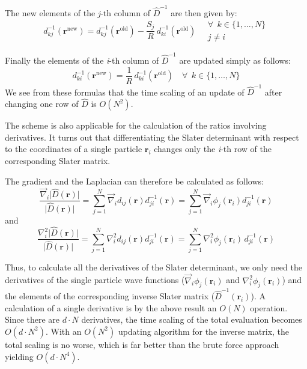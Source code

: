 \documentclass[graybox,sectrefs,envcountresetchap,open=right]{svmonodo}
\begin{document}
The new elements of the \emph{j}-th column of $\hat{D}^{-1}$ are then given
by:
\begin{equation}
d_{kj}^{-1}(\mathbf{r}^{\mathrm{new}}) =
d_{kj}^{-1}(\mathbf{r}^{\mathrm{old}}) -
\frac{S_j}{R}\,d_{ki}^{-1}(\mathbf{r}^{\mathrm{old}})\quad
\begin{array}{ll}
\forall\ \ k\in\{1,\dots,N\}\\j\neq i
\end{array}
\label{eq:inverse_update_2}
\end{equation}






Finally the elements of the \emph{i}-th column of $\hat{D}^{-1}$ are updated
simply as follows:
\begin{equation}
d_{ki}^{-1}(\mathbf{r}^{\mathrm{new}}) =
\frac{1}{R}\,d_{ki}^{-1}(\mathbf{r}^{\mathrm{old}})\quad
\forall\ \ k\in\{1,\dots,N\}
\label{eq:inverse_update_3}
\end{equation}
We see from these formulas that the time scaling of an update of
$\hat{D}^{-1}$ after changing one row of $\hat{D}$ is $O(N^2)$.


The scheme is also applicable for the calculation of the ratios
involving derivatives. It turns
out that differentiating the Slater determinant with respect
to the coordinates of a single particle  $\mathbf{r}_i$ changes only the
\emph{i}-th row of the corresponding Slater matrix. 



The gradient and the Laplacian can therefore be calculated as follows:
\[
\frac{\vec\nabla_i\vert\hat{D}(\mathbf{r})\vert}{\vert\hat{D}(\mathbf{r})\vert} =
\sum_{j=1}^N \vec\nabla_i d_{ij}(\mathbf{r})d_{ji}^{-1}(\mathbf{r}) =
\sum_{j=1}^N \vec\nabla_i \phi_j(\mathbf{r}_i)d_{ji}^{-1}(\mathbf{r})
\]
and
\[
\frac{\nabla^2_i\vert\hat{D}(\mathbf{r})\vert}{\vert\hat{D}(\mathbf{r})\vert} =
\sum_{j=1}^N \nabla^2_i d_{ij}(\mathbf{r})d_{ji}^{-1}(\mathbf{r}) =
\sum_{j=1}^N \nabla^2_i \phi_j(\mathbf{r}_i)\,d_{ji}^{-1}(\mathbf{r})
\]





Thus, to calculate all the derivatives of the Slater determinant, we
only need the derivatives of the single particle  wave functions
($\vec\nabla_i \phi_j(\mathbf{r}_i)$ and $\nabla^2_i \phi_j(\mathbf{r}_i)$)
and the elements of the corresponding inverse Slater matrix ($\hat{D}^{-1}(\mathbf{r}_i)$). A calculation of a single derivative is by the
above result an $O(N)$ operation. Since there are $d\cdot N$
derivatives, the time scaling of the total evaluation becomes
$O(d\cdot N^2)$. With an $O(N^2)$ updating algorithm for the
inverse matrix, the total scaling is no worse, which is far better
than the brute force approach yielding $O(d\cdot N^4)$.
\end{document}

